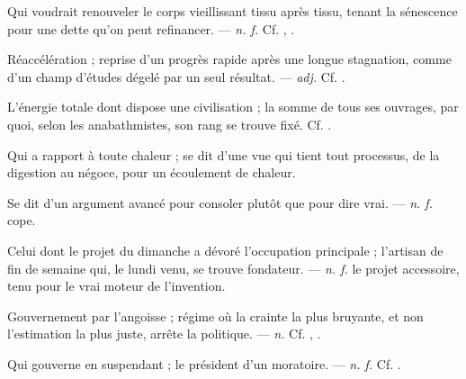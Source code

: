  Qui voudrait renouveler le corps vieillissant tissu après tissu, tenant la sénescence pour une dette qu'on peut refinancer. ---  \textit{n. f.} Cf. , .

 Réaccélération ; reprise d'un progrès rapide après une longue stagnation, comme d'un champ d'études dégelé par un seul résultat.   ---  \textit{adj.} Cf. .

 L'énergie totale dont dispose une civilisation ; la somme de tous ses ouvrages, par quoi, selon les anabathmistes, son rang se trouve fixé. Cf. .

 Qui a rapport à toute chaleur ; se dit d'une vue qui tient tout processus, de la digestion au négoce, pour un écoulement de chaleur.

 Se dit d'un argument avancé pour consoler plutôt que pour dire vrai. ---  \textit{n. f.}  cope. 

 Celui dont le projet du dimanche a dévoré l'occupation principale ; l'artisan de fin de semaine qui, le lundi venu, se trouve fondateur. ---  \textit{n. f.} le projet accessoire, tenu pour le vrai moteur de l'invention.

 Gouvernement par l'angoisse ; régime où la crainte la plus bruyante, et non l'estimation la plus juste, arrête la politique. ---  \textit{n.} Cf. , .

 Qui gouverne en suspendant ; le président d'un moratoire.   ---  \textit{n. f.} Cf. .

